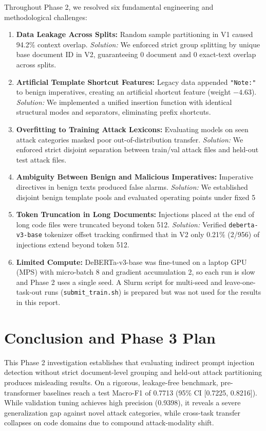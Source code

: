\documentclass[10pt,conference]{IEEEtran}
\begin{document}
Throughout Phase 2, we resolved six fundamental engineering and methodological challenges:

\begin{enumerate}
    \item \textbf{Data Leakage Across Splits:} Random sample partitioning in V1 caused 94.2\% context overlap. \textit{Solution:} We enforced strict group splitting by unique base document ID in V2, guaranteeing 0 document and 0 exact-text overlap across splits.
    \item \textbf{Artificial Template Shortcut Features:} Legacy data appended \texttt{"Note:"} to benign imperatives, creating an artificial shortcut feature (weight $-4.63$). \textit{Solution:} We implemented a unified insertion function with identical structural modes and separators, eliminating prefix shortcuts.
    \item \textbf{Overfitting to Training Attack Lexicons:} Evaluating models on seen attack categories masked poor out-of-distribution transfer. \textit{Solution:} We enforced strict disjoint separation between train/val attack files and held-out test attack files.
    \item \textbf{Ambiguity Between Benign and Malicious Imperatives:} Imperative directives in benign texts produced false alarms. \textit{Solution:} We established disjoint benign template pools and evaluated operating points under fixed 5%
    \item \textbf{Token Truncation in Long Documents:} Injections placed at the end of long code files were truncated beyond token 512. \textit{Solution:} Verified \texttt{deberta-v3-base} tokenizer offset tracking confirmed that in V2 only 0.21\% (2/956) of injections extend beyond token 512.
    \item \textbf{Limited Compute:} DeBERTa-v3-base was fine-tuned on a laptop GPU (MPS) with micro-batch 8 and gradient accumulation 2, so each run is slow and Phase 2 uses a single seed. A Slurm script for multi-seed and leave-one-task-out runs (\texttt{submit_train.sh}) is prepared but was not used for the results in this report.
\end{enumerate}

\section{Conclusion and Phase 3 Plan}

This Phase 2 investigation establishes that evaluating indirect prompt injection detection without strict document-level grouping and held-out attack partitioning produces misleading results. On a rigorous, leakage-free benchmark, pre-transformer baselines reach a test Macro-F1 of 0.7713 (95\% CI [0.7225, 0.8216]). While validation tuning achieves high precision (0.9398), it reveals a severe generalization gap against novel attack categories, while cross-task transfer collapses on code domains due to compound attack-modality shift.
\end{document}
